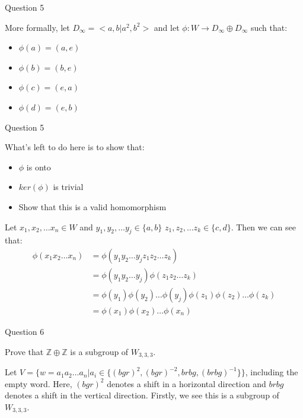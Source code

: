 \documentclass[usenames,dvipsnames]{beamer}
\newcommand{\Z}{\mathbb{Z}}
\begin{document}
\begin{frame}{Question 5}

More formally, let $D_\infty=<a,b|a^2,b^2>$ and let $\phi:W\rightarrow D_\infty \oplus D_\infty$ such that:

 \pause

\begin{itemize}
  \item $\phi(a)=(a,e)$
  \item $\phi(b)=(b,e)$
  \item $\phi(c)=(e,a)$
  \item $\phi(d)=(e,b)$
\end{itemize}

\end{frame}

\begin{frame}{Question 5}

What's left to do here is to show that:

\begin{itemize}
\item $\phi$ is onto
\item $ker(\phi)$ is trivial
\item Show that this is a valid homomorphism
\end{itemize}

Let $x_1,x_2, \ldots x_n \in W$ and  $y_1,y_2, \ldots y_j\in \{a,b\}$ $z_1,z_2, \ldots z_k\in \{c,d\}$.
Then we can see that:
\begin{align*}
\phi(x_1x_2 \ldots x_n)
&=\phi(y_1y_2 \ldots y_jz_1z_2 \ldots z_k)\\
&=\phi(y_1y_2 \ldots y_j)\phi(z_1z_2 \ldots z_k)\\
&=\phi(y_1)\phi(y_2) \ldots \phi(y_j)\phi(z_1)\phi(z_2) \ldots \phi(z_k)\\
&=\phi(x_1)\phi(x_2) \ldots \phi(x_n)
\end{align*}
\end{frame}

\begin{frame}{Question 6}

Prove that $\Z \oplus \Z$ is a subgroup of $W_{3,3,3}$.\\

\pause

Let $V=\{w={a_1a_2\ldots a_n} | a_i\in\{(bgr)^2,(bgr)^{-2},brbg,(brbg)^{-1}\}\}$, including the empty word.
Here, $(bgr)^2$ denotes a shift in a horizontal direction and $brbg$ denotes a shift in the vertical
direction. Firstly, we see this is a subgroup of $W_{3,3,3}$.

\end{frame}
\end{document}
